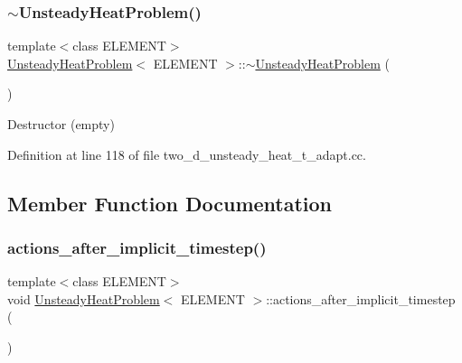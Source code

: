 \mbox{\label{classUnsteadyHeatProblem_acd342b40828d9e18b3571e00b3d34add}} 
\subsubsection{\texorpdfstring{$\sim$\+Unsteady\+Heat\+Problem()}{~UnsteadyHeatProblem()}}
{\footnotesize\ttfamily template$<$class E\+L\+E\+M\+E\+NT$>$ \\
\hyperlink{classUnsteadyHeatProblem}{Unsteady\+Heat\+Problem}$<$ E\+L\+E\+M\+E\+NT $>$\+::$\sim$\hyperlink{classUnsteadyHeatProblem}{Unsteady\+Heat\+Problem} (\begin{DoxyParamCaption}{ }\end{DoxyParamCaption})\hspace{0.3cm}{\ttfamily [inline]}}



Destructor (empty) 



Definition at line 118 of file two\+\_\+d\+\_\+unsteady\+\_\+heat\+\_\+t\+\_\+adapt.\+cc.



\subsection{Member Function Documentation}
\mbox{\label{classUnsteadyHeatProblem_afd14cbe343adfa39e3b8b2ca681c5020}} 
\subsubsection{\texorpdfstring{actions\+\_\+after\+\_\+implicit\+\_\+timestep()}{actions\_after\_implicit\_timestep()}}
{\footnotesize\ttfamily template$<$class E\+L\+E\+M\+E\+NT$>$ \\
void \hyperlink{classUnsteadyHeatProblem}{Unsteady\+Heat\+Problem}$<$ E\+L\+E\+M\+E\+NT $>$\+::actions\+\_\+after\+\_\+implicit\+\_\+timestep (\begin{DoxyParamCaption}{ }\end{DoxyParamCaption})\hspace{0.3cm}{\ttfamily [inline]}}




